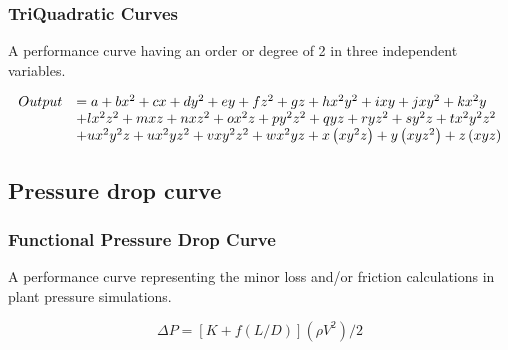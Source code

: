 \subsubsection{TriQuadratic Curves}\label{triquadratic-curves}

A performance curve having an order or degree of 2 in three independent variables.

\begin{equation}
\begin{array}{ll}
Output &= a + bx^2 + cx + dy^2 + ey + fz^2 + gz + hx^2y^2 + ixy + jxy^2 + kx^2y \\
       &+ lx^2z^2 + mxz + nxz^2 + ox^2z + py^2z^2 + qyz + ryz^2 + sy^2z + tx^2y^2z^2 \\
       &+ ux^2y^2z + ux^2yz^2 + vxy^2z^2 + wx^2yz + x\left(xy^2z\right) + y\left(xyz^2\right) + z\left(xyz\right)
\end{array}
\end{equation}

\subsection{Pressure drop curve}\label{pressure-drop-curve}

\subsubsection{Functional Pressure Drop Curve}\label{functional-pressure-drop-curve}

A performance curve representing the minor loss and/or friction calculations in plant pressure simulations.

\begin{equation}
\Delta P = \left[ {K + f\left( {L/D} \right)} \right]\left( {\rho {V^2}} \right)/2
\end{equation}

